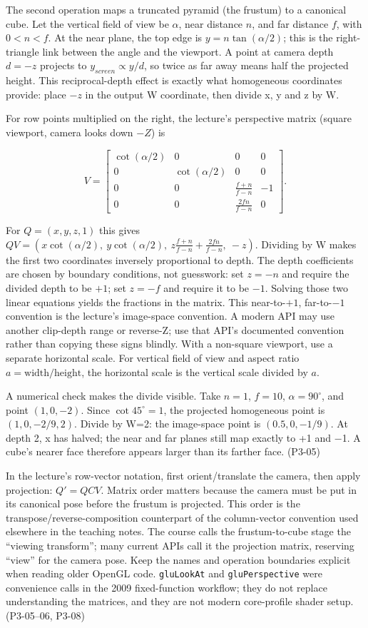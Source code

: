 The second operation maps a truncated pyramid (the frustum) to a canonical cube. Let the vertical field of view be \(\alpha\), near distance \(n\), and far distance \(f\), with \(0<n<f\). At the near plane, the top edge is \(y=n\tan(\alpha/2)\); this is the right-triangle link between the angle and the viewport. A point at camera depth \(d=-z\) projects to \(y_{screen}\propto y/d\), so twice as far away means half the projected height. This reciprocal-depth effect is exactly what homogeneous coordinates provide: place \(-z\) in the output W coordinate, then divide x, y and z by W.

For row points multiplied on the right, the lecture's perspective matrix (square viewport, camera looks down \(-Z\)) is

\[
V=\begin{bmatrix}
\cot(\alpha/2)&0&0&0\\
0&\cot(\alpha/2)&0&0\\
0&0&\frac{f+n}{f-n}&-1\\
0&0&\frac{2fn}{f-n}&0
\end{bmatrix}.
\]

For \(Q=(x,y,z,1)\) this gives \(Q V=(x\cot(\alpha/2),\ y\cot(\alpha/2),\ z\frac{f+n}{f-n}+\frac{2fn}{f-n},\ -z)\). Dividing by W makes the first two coordinates inversely proportional to depth. The depth coefficients are chosen by boundary conditions, not guesswork: set \(z=-n\) and require the divided depth to be \(+1\); set \(z=-f\) and require it to be \(-1\). Solving those two linear equations yields the fractions in the matrix. This near-to-\(+1\), far-to-\(-1\) convention is the lecture's image-space convention. A modern API may use another clip-depth range or reverse-Z; use that API's documented convention rather than copying these signs blindly. With a non-square viewport, use a separate horizontal scale. For vertical field of view and aspect ratio \(a=\text{width}/\text{height}\), the horizontal scale is the vertical scale divided by \(a\).

A numerical check makes the divide visible. Take \(n=1\), \(f=10\), \(\alpha=90^\circ\), and point \((1,0,-2)\). Since \(\cot45^\circ=1\), the projected homogeneous point is \((1,0,-2/9,2)\). Divide by W=2: the image-space point is \((0.5,0,-1/9)\). At depth 2, x has halved; the near and far planes still map exactly to +1 and −1. A cube's nearer face therefore appears larger than its farther face. (P3-05)

In the lecture's row-vector notation, first orient/translate the camera, then apply projection: \(Q'=QCV\). Matrix order matters because the camera must be put in its canonical pose before the frustum is projected. This order is the transpose/reverse-composition counterpart of the column-vector convention used elsewhere in the teaching notes. The course calls the frustum-to-cube stage the ``viewing transform''; many current APIs call it the projection matrix, reserving ``view'' for the camera pose. Keep the names and operation boundaries explicit when reading older OpenGL code. \texttt{gluLookAt} and \texttt{gluPerspective} were convenience calls in the 2009 fixed-function workflow; they do not replace understanding the matrices, and they are not modern core-profile shader setup. (P3-05--06, P3-08)

